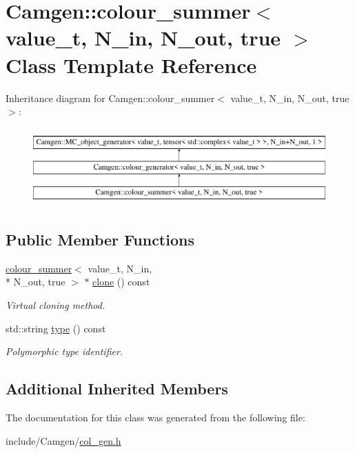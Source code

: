 \hypertarget{a00094}{\section{Camgen\-:\-:colour\-\_\-summer$<$ value\-\_\-t, N\-\_\-in, N\-\_\-out, true $>$ Class Template Reference}
\label{a00094}
}
Inheritance diagram for Camgen\-:\-:colour\-\_\-summer$<$ value\-\_\-t, N\-\_\-in, N\-\_\-out, true $>$\-:\begin{figure}[H]
\begin{center}
\leavevmode
\includegraphics[height=3.000000cm]{a00094}
\end{center}
\end{figure}
\subsection*{Public Member Functions}
\begin{DoxyCompactItemize}
\item 
\hypertarget{a00094_a3fd07aca293519580f410a0f96f7966b}{\hyperlink{a00092}{colour\-\_\-summer}$<$ value\-\_\-t, N\-\_\-in, \\*
N\-\_\-out, true $>$ $\ast$ \hyperlink{a00094_a3fd07aca293519580f410a0f96f7966b}{clone} () const }\label{a00094_a3fd07aca293519580f410a0f96f7966b}

\begin{DoxyCompactList}\small\item\em Virtual cloning method. \end{DoxyCompactList}\item 
\hypertarget{a00094_aa24d7210b2e5ddb1c6553d0394f0722b}{std\-::string \hyperlink{a00094_aa24d7210b2e5ddb1c6553d0394f0722b}{type} () const }\label{a00094_aa24d7210b2e5ddb1c6553d0394f0722b}

\begin{DoxyCompactList}\small\item\em Polymorphic type identifier. \end{DoxyCompactList}\end{DoxyCompactItemize}
\subsection*{Additional Inherited Members}


The documentation for this class was generated from the following file\-:\begin{DoxyCompactItemize}
\item 
include/\-Camgen/\hyperlink{a00593}{col\-\_\-gen.\-h}\end{DoxyCompactItemize}
